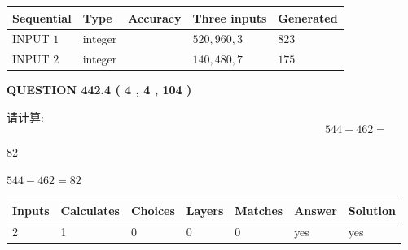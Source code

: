 \documentclass{ctexart}
\begin{document}
   
  
  
\noindent\begin{tabular}{|l|l|l|l|l|}
\hline
 Sequential & Type & Accuracy & Three inputs & Generated \\ 
\hline
 
 
  INPUT $  1 $ & integer &  & $
 520
 , 
 960
 , 
 3
 $ & $ 823 $ 
 \\  \hline  
 
 
  INPUT $  2 $ & integer &  & $
 140
 , 
 480
 , 
 7
 $ & $ 175 $ 
 \\  \hline  
 \end{tabular}
   
   
  
\vspace{0.2in}
  
{\textbf{\Large{QUESTION
442.4 
 ( 4 , 4 , 104 )
}}}
  
  
 
请计算:
\begin{equation}
544 -   %
462 = \nonumber
\end{equation}
 
 
 
\noindent{}
 
 

82
 
 
\noindent{}
 
 

 
 
 
\noindent{}
 
 

$ %
544 -  %
462=   %
82$
 
 
\noindent{}
 
 

 
   
   
   
   
\noindent\begin{tabular}{|l|l|l|l|l|l|l|}
 \hline
Inputs & Calculates & Choices & Layers & Matches & Answer & Solution \\ \hline
 2  & 
 1  & 
 0
  & 
 0  & 
 0  & 
  yes & 
  yes 
  \\ \hline
 \end{tabular}
   
\end{document}

